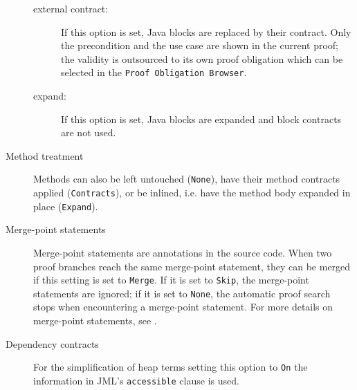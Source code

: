 \begin{description}
\begin{description}
	\item[external contract:] If this option is set, Java blocks are replaced by their contract.
	Only the precondition and the use case are shown in the current proof; the validity is outsourced to its own proof obligation which can be selected in the \texttt{Proof Obligation Browser}.
	
	\item[expand:] If this option is set, Java blocks are expanded and block contracts are not used.
\end{description}

    \item[Method treatment] Methods can also be left untouched
(\texttt{None}), have their method contracts applied
(\texttt{Contracts}), or be inlined, i.e. have the method body
expanded in place (\texttt{Expand}).

  \item[Merge-point statements] Merge-point statements are annotations in the source code. When two proof branches reach the same merge-point statement, they can be merged if this setting is set to \texttt{Merge}. If it is set to \texttt{Skip}, the merge-point statements are ignored; if it is set to \texttt{None}, the automatic proof search stops when encountering a merge-point statement. For more details on merge-point statements, see \cite{Steinhoefel2019}.
      
    \item[Dependency contracts] For the simplification of heap terms setting this option to \texttt{On}
				the information in JML's \texttt{accessible} clause is used. 
    

\end{description}
